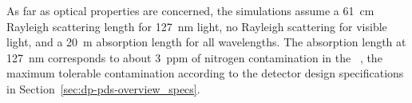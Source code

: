 As far as  optical properties are concerned, the simulations assume a \SI{61}{\cm} Rayleigh scattering length for \SI{127}{\nm} light, no Rayleigh scattering for visible light, and a \SI{20}{\m} absorption length for all wavelengths. The absorption length at \SI{127}{\nm} corresponds to about \SI{3}{ppm} of nitrogen contamination in the ~\cite{Jones:2013bca}, the maximum tolerable contamination according to the detector design specifications in Section~\ref{sec:dp-pds-overview_specs}. 

